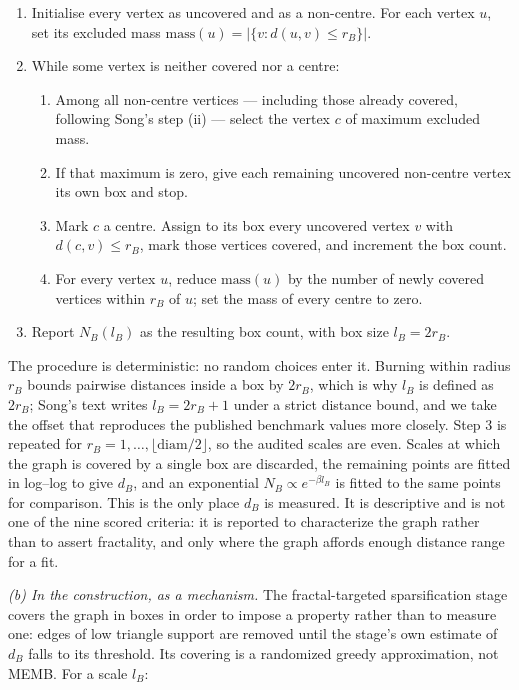 \documentclass[12pt]{article}
\begin{document}
\begin{enumerate}
\item Initialise every vertex as uncovered and as a non-centre.  For each
vertex \(u\), set its excluded mass
\(\mathrm{mass}(u)=|\{v: d(u,v)\le r_B\}|\).
\item While some vertex is neither covered nor a centre:
  \begin{enumerate}
  \item Among all non-centre vertices --- including those already covered,
        following Song's step (ii) --- select the vertex \(c\) of maximum
        excluded mass.
  \item If that maximum is zero, give each remaining uncovered non-centre
        vertex its own box and stop.
  \item Mark \(c\) a centre.  Assign to its box every uncovered vertex \(v\)
        with \(d(c,v)\le r_B\), mark those vertices covered, and increment the
        box count.
  \item For every vertex \(u\), reduce \(\mathrm{mass}(u)\) by the number of
        newly covered vertices within \(r_B\) of \(u\); set the mass of every
        centre to zero.
  \end{enumerate}
\item Report \(N_B(l_B)\) as the resulting box count, with box size
\(l_B=2r_B\).
\end{enumerate}

The procedure is deterministic: no random choices enter it.  Burning within
radius \(r_B\) bounds pairwise distances inside a box by \(2r_B\), which is
why \(l_B\) is defined as \(2r_B\); Song's text writes \(l_B=2r_B+1\) under a
strict distance bound, and we take the offset that reproduces the published
benchmark values more closely.  Step 3 is repeated for
\(r_B=1,\dots,\lfloor \mathrm{diam}/2\rfloor\), so the audited scales are
even.  Scales at which the graph is covered by a single box are discarded,
the remaining points are fitted in log--log to give \(d_B\), and an
exponential \(N_B \propto e^{-\beta l_B}\) is fitted to the same points for
comparison.  This is the only place \(d_B\) is measured.  It is descriptive
and is not one of the nine scored criteria: it is reported to characterize the
graph rather than to assert fractality, and only where the graph affords
enough distance range for a fit.

\emph{(b) In the construction, as a mechanism.}  The fractal-targeted
sparsification stage covers the graph in boxes in order to impose a property
rather than to measure one: edges of low triangle support are removed until
the stage's own estimate of \(d_B\) falls to its threshold.  Its covering is a
randomized greedy approximation, not MEMB.  For a scale \(l_B\):
\end{document}
